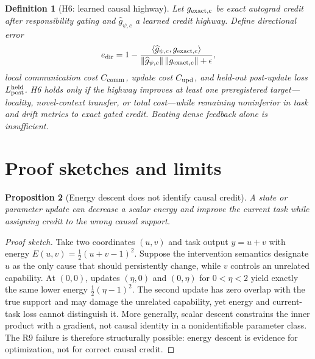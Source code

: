 \documentclass[11pt]{article}
\newtheorem{definition}{Definition}[section]
\newtheorem{proposition}[definition]{Proposition}
\begin{document}
\begin{definition}[H6: learned causal highway]
Let $g_{\rm exact,c}$ be exact autograd credit after responsibility gating and
$\widehat g_{\psi,c}$ a learned credit highway.  Define directional error
\[
 e_{\rm dir}=1-
 \frac{\langle\widehat g_{\psi,c},g_{\rm exact,c}\rangle}
 {\|\widehat g_{\psi,c}\|\,\|g_{\rm exact,c}\|+\epsilon},
\]
local communication cost $C_{\rm comm}$, update cost $C_{\rm upd}$, and
held-out post-update loss $L_{\rm post}^{\rm held}$.  H6 holds only if the
highway improves at least one preregistered target---locality, novel-context
transfer, or total cost---while remaining noninferior in task and drift metrics
to exact gated credit.  Beating dense feedback alone is insufficient.
\end{definition}

\section{Proof sketches and limits}

\begin{proposition}[Energy descent does not identify causal credit]
A state or parameter update can decrease a scalar energy and improve the
current task while assigning credit to the wrong causal support.
\end{proposition}
\begin{proof}[Proof sketch]
Take two coordinates $(u,v)$ and task output $y=u+v$ with energy
$E(u,v)=\tfrac12(u+v-1)^2$.  Suppose the intervention semantics designate
$u$ as the only cause that should persistently change, while $v$ controls an
unrelated capability.  At $(0,0)$, updates $(\eta,0)$ and $(0,\eta)$ for
$0<\eta<2$ yield exactly the same lower energy
$\tfrac12(\eta-1)^2$.  The second update has zero overlap with the true support
and may damage the unrelated capability, yet energy and current-task loss
cannot distinguish it.  More generally, scalar descent constrains the inner
product with a gradient, not causal identity in a nonidentifiable parameter
class.  The R9 failure is therefore structurally possible: energy descent is
evidence for optimization, not for correct causal credit.
\end{proof}
\end{document}
